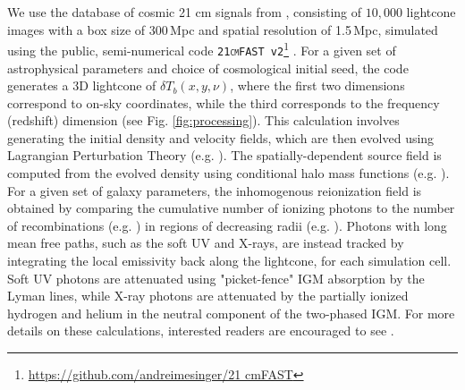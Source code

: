 \documentclass[fleqn,usenatbib]{mnras}
\newcommand{\cmfast}{\textsc{{\tt 21cmFAST}}}
\begin{document}
We use the database of cosmic 21 cm signals from \cite{gillet19}, consisting of $10,000$ lightcone images with a box size of 300\,Mpc and spatial resolution of 1.5\,Mpc, simulated using the public, semi-numerical code \texttt{\cmfast{} v2}\footnote{\url{https://github.com/andreimesinger/21 cmFAST}} \citep{21cmFAST_Mesinger_07, 21cmFAST_Mesinger11}.  
For a given set of astrophysical parameters and choice of cosmological initial seed, the code generates a 3D lightcone of $\delta T_{b}(x, y, \nu)$, where the first two dimensions correspond to on-sky coordinates, while the third corresponds to the frequency (redshift) dimension (see Fig. \ref{fig:processing}).  This calculation involves generating the initial density and velocity fields, which are then evolved using Lagrangian Perturbation Theory (e.g. \citealt{zeldovich1970}).  The spatially-dependent source field is computed from the evolved density using conditional halo mass functions (e.g. \citealt{barkana2004}).  For a given set of galaxy parameters, the inhomogenous reionization field is obtained by comparing the cumulative number of ionizing photons to the number of recombinations (e.g. \citealt{sobacchi2014}) in regions of decreasing radii (e.g. \citealt{furlanetto2004}).  Photons with long mean free paths, such as the soft UV and X-rays, are instead tracked by integrating the local emissivity back along the lightcone, for each simulation cell.  Soft UV photons are attenuated using "picket-fence" IGM absorption by the Lyman lines, while X-ray photons are attenuated by the partially ionized hydrogen and helium in the neutral component of the two-phased IGM.  For more details on these calculations, interested readers are encouraged to see \citep{21cmFAST_Mesinger_07, 21cmFAST_Mesinger11}.
\end{document}
